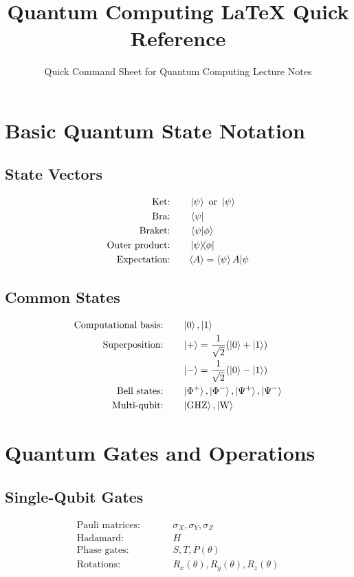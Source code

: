 \documentclass[12pt]{article}
\title{\textbf{\Large Quantum Computing LaTeX Quick Reference}}
\author{Quick Command Sheet for Quantum Computing Lecture Notes}
\date{}
\newcommand{\expectation}[1]{\langle#1\rangle}
\newcommand{\qzero}{\ket{0}}
\newcommand{\qone}{\ket{1}}
\newcommand{\qplus}{\ket{+}}
\newcommand{\qminus}{\ket{-}}
\newcommand{\qpsi}{\ket{\psi}}
\newcommand{\bellphi}{\ket{\Phi^+}}
\newcommand{\bellphim}{\ket{\Phi^-}}
\newcommand{\bellpsi}{\ket{\Psi^+}}
\newcommand{\bellpsim}{\ket{\Psi^-}}
\newcommand{\GHZ}{\ket{\text{GHZ}}}
\newcommand{\Wstate}{\ket{\text{W}}}
\newcommand{\pauliX}{\sigma_X}
\newcommand{\pauliY}{\sigma_Y}
\newcommand{\pauliZ}{\sigma_Z}
\newcommand{\hadamard}{H}
\newcommand{\rx}[1]{R_x(#1)}
\newcommand{\ry}[1]{R_y(#1)}
\newcommand{\rz}[1]{R_z(#1)}
\newcommand{\phaseS}{S}
\newcommand{\phaseT}{T}
\newcommand{\phaseP}[1]{P(#1)}
\theoremstyle{definition}
\theoremstyle{remark}
\begin{document}
\maketitle
\thispagestyle{fancy}

\begin{multicols}{2}

\section{Basic Quantum State Notation}

\subsection{State Vectors}
\begin{alignat}{2}
\text{Ket:}          &\quad && \ket{\psi} \text{ or } \qpsi \\
\text{Bra:}          &\quad && \bra{\psi} \\
\text{Braket:}       &\quad && \braket{\psi | \phi} \\
\text{Outer product:}&\quad && \ketbra{\psi}{\phi} \\
\text{Expectation:}  &\quad && \expectation{A} = \braket{\psi}{A|\psi}
\end{alignat}

\subsection{Common States}
\begin{alignat}{2}
\text{Computational basis:} &\quad && \qzero, \qone \\
\text{Superposition:}       &\quad && \qplus = \frac{1}{\sqrt{2}}(\qzero + \qone) \\
                             &\quad && \qminus = \frac{1}{\sqrt{2}}(\qzero - \qone) \\
\text{Bell states:}         &\quad && \bellphi, \bellphim, \bellpsi, \bellpsim \\
\text{Multi-qubit:}         &\quad && \GHZ, \Wstate
\end{alignat}


\section{Quantum Gates and Operations}

\subsection{Single-Qubit Gates}
\begin{alignat}{2}
\text{Pauli matrices:} &\quad && \pauliX, \pauliY, \pauliZ \\
\text{Hadamard:}       &\quad && \hadamard \\
\text{Phase gates:}    &\quad && \phaseS, \phaseT, \phaseP{\theta} \\
\text{Rotations:}      &\quad && \rx{\theta}, \ry{\theta}, \rz{\theta}
\end{alignat}


\end{multicols}
\end{document}
